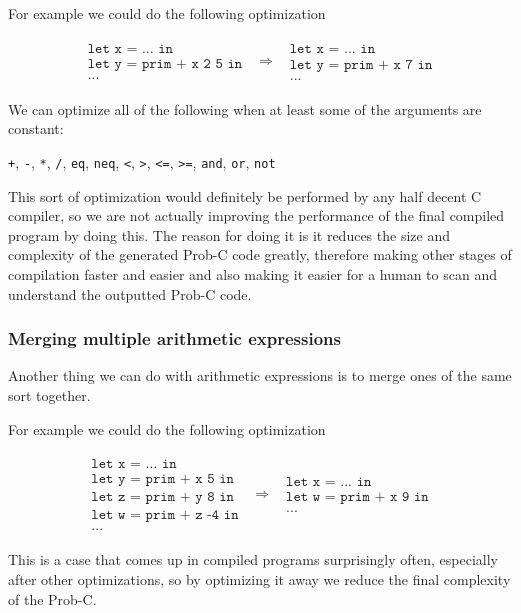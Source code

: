 \documentclass[a4paper]{article}
\newcommand{\optimization}[2]{
	\[
		\begin{array}{rcl}
			#1 & \Rightarrow & #2
		\end{array}
	\]
}
\begin{document}
For example we could do the following optimization
\optimization{
	\begin{array}{l}
		\texttt{let x = ... in} \\
		\texttt{let y = prim + x 2 5 in} \\
		\texttt{...}
	\end{array}
}{
	\begin{array}{l}
		\texttt{let x = ... in} \\
		\texttt{let y = prim + x 7 in} \\
		\texttt{...}
	\end{array}
}
We can optimize all of the following when at least some of the arguments are constant:
\begin{center}
	\texttt{+}, \texttt{-}, \texttt{*}, \texttt{/}, \texttt{eq}, \texttt{neq}, \texttt{<}, \texttt{>}, \texttt{<=}, \texttt{>=}, \texttt{and}, \texttt{or}, \texttt{not}
\end{center}
This sort of optimization would definitely be performed by any half decent C compiler, so we are not actually improving the performance of the final compiled program by doing this. The reason for doing it is it reduces the size and complexity of the generated Prob-C code greatly, therefore making other stages of compilation faster and easier and also making it easier for a human to scan and understand the outputted Prob-C code.




\subsubsection{Merging multiple arithmetic expressions}

Another thing we can do with arithmetic expressions is to merge ones of the same sort together.

For example we could do the following optimization
\optimization{
	\begin{array}{l}
		\texttt{let x = ... in} \\
		\texttt{let y = prim + x 5 in} \\
		\texttt{let z = prim + y 8 in} \\
		\texttt{let w = prim + z -4 in} \\
		\texttt{...}
	\end{array}
}{
	\begin{array}{l}
		\texttt{let x = ... in} \\
		\texttt{let w = prim + x 9 in} \\
		\texttt{...}
	\end{array}
}
This is a case that comes up in compiled programs surprisingly often, especially after other optimizations, so by optimizing it away we reduce the final complexity of the Prob-C.
\end{document}
